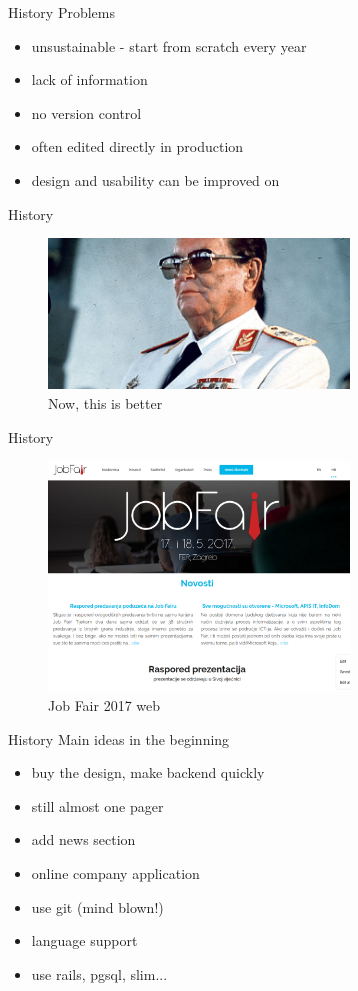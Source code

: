 \documentclass{beamer}
\begin{document}
	\begin{frame}{History}
		Problems
		\begin{itemize}
			\item unsustainable - start from scratch every year
			\item lack of information
			\item no version control
			\item often edited directly in production
			\item design and usability can be improved on
		\end{itemize}
	\end{frame}

	\begin{frame}{History}
		\hspace{2cm}
		\begin{figure}
			\includegraphics[width=8cm]{joza}
			\caption{Now, this is better}
		\end{figure}
	\end{frame}

	\begin{frame}{History}
		\begin{figure}
			\includegraphics[width=8cm]{jf-17}
			\caption{Job Fair 2017 web}
		\end{figure}
	\end{frame}

	\begin{frame}{History}
		Main ideas in the beginning
		\begin{itemize}
			\item buy the design, make backend quickly
			\item still almost one pager
			\item add news section
			\item online company application
			\item use git (mind blown!)
			\item language support
			\item use rails, pgsql, slim...
		\end{itemize}
	\end{frame}
\end{document}
